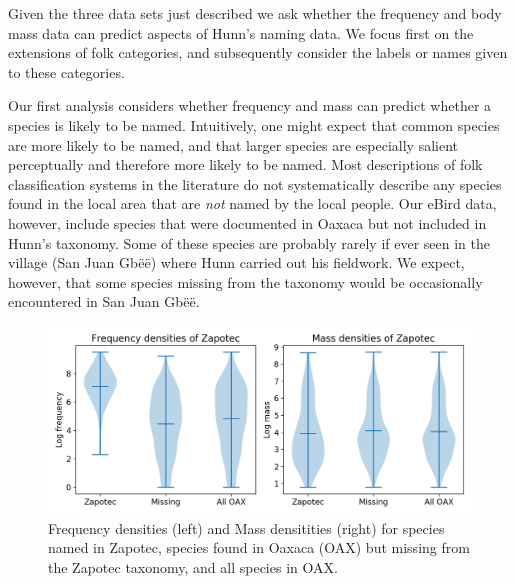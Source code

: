 \documentclass[10pt,letterpaper]{article}
\begin{document}
Given the three data sets just described we ask whether the frequency and body mass data can predict aspects of Hunn's naming data.  We focus first on the extensions of folk categories, and subsequently consider the labels or names given to these categories. 

Our first analysis considers whether frequency and mass can predict whether a species is likely to be named. Intuitively, one might expect that common species are more likely to be named, and that larger species are especially salient perceptually and therefore more likely to be named. Most descriptions of folk classification systems in the literature do not systematically describe any species found in the local area that are \emph{not} named by the local people. Our eBird data, however, include species that were documented in Oaxaca but not included in Hunn's taxonomy. Some of these species are probably rarely if ever seen in the village (San Juan Gb\"{e}\"{e}) where Hunn carried out his fieldwork. We expect, however, that some species missing from the taxonomy would be occasionally encountered in San Juan Gb\"{e}\"{e}. 

\begin{figure}[hbt!]
  \begin{center}
    \includegraphics[width=.95\textwidth]{./figures/birdfreqmass-violinplots.png}
        \caption{Frequency densities (left) and Mass densitities (right) for species named in Zapotec, species found in Oaxaca (OAX) but missing from the Zapotec taxonomy, and all species in OAX.}
        \label{fig-birdfreqmassviolin}
  \end{center}
\end{figure}
\end{document}
